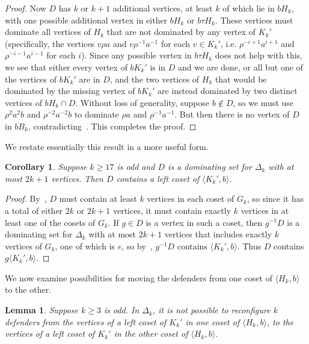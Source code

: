 \documentclass{amsart}
\newtheorem{cor}[thm]{Corollary}
\newtheorem{lem}[thm]{Lemma}
\theoremstyle{remark}
\theoremstyle{definition}
\begin{document}
\begin{proof}
Now $D$ has $k$ or $k+1$ additional vertices, at least $k$ of which lie in $bH_k$, with one possible additional vertex in either $bH_k$ or $b\tau H_k$. These vertices must dominate all vertices of $H_k$ that are not dominated by any vertex of $K_k'$ (specifically, the vertices $v\rho a$ and $v\rho^{-1}a^{-1}$ for each $v \in K_k'$, i.e. $\rho^{-i+1}a^{i+1}$ and $\rho^{-i-1}a^{i-1}$ for each $i$). Since any possible vertex in $b \tau H_k$ does not help with this, we see that either every vertex of $bK_k'$ is in $D$ and we are done, or all but one of the vertices of $bK_k'$ are in $D$, and the two vertices of $H_k$ that would be dominated by the missing vertex of $bK_k'$ are instead dominated by two distinct vertices of $bH_k\cap D$. Without loss of generality, suppose $b \notin D$, so we must use $\rho^2a^2b$ and $\rho^{-2}a^{-2}b$ to dominate $\rho a$ and $\rho^{-1}a^{-1}$. But then there is no vertex of $D$ in $bB_k$, contradicting~. This completes the proof.
\end{proof}

We restate essentially this result in a more useful form.

\begin{cor}\label{K'b-cosets}
Suppose $k \ge 17$ is odd and $D$ is a dominating set for $\Delta_k$ with at most $2k+1$ vertices. Then $D$ contains a left coset of $\langle K_k',b\rangle$.
\end{cor}

\begin{proof}
    By~, $D$ must contain at least $k$ vertices in each coset of $G_k$, so since it has a total of either $2k$ or $2k+1$ vertices, it must contain exactly $k$ vertices in at least one of the cosets of $G_k$. If $g\in D$ is a vertex in such a coset, then $g^{-1}D$ is a dominating set for $\Delta_k$ with at most $2k+1$ vertices that includes exactly $k$ vertices of $G_k$, one of which is $e$, so by~, $g^{-1}D$ contains $\langle K_k',b\rangle$. Thus $D$ contains $g\langle K_k',b\rangle$.
\end{proof}

We now examine possibilities for moving the defenders from one coset of $\langle H_k,b\rangle$ to the other.

\begin{lem}\label{moving}
Suppose $k \ge 3$ is odd. In $\Delta_k$, it is not possible to reconfigure $k$ defenders from the vertices of a left coset of $K_k'$ in one coset of $\langle H_k,b\rangle$, to the vertices of a left coset of $K_k'$ in the other coset of $\langle H_k,b\rangle$.
\end{lem}
\end{document}
